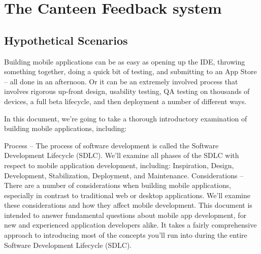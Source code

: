 
\chapter{ The Canteen Feedback system} %

\label{Chapter6} %




\section{Hypothetical Scenarios}


Building mobile applications can be as easy as opening up the IDE, throwing something together, doing a quick bit of testing, and submitting to an App Store – all done in an afternoon. Or it can be an extremely involved process that involves rigorous up-front design, usability testing, QA testing on thousands of devices, a full beta lifecycle, and then deployment a number of different ways.

In this document, we’re going to take a thorough introductory examination of building mobile applications, including:

Process – The process of software development is called the Software Development Lifecycle (SDLC). We’ll examine all phases of the SDLC with respect to mobile application development, including: Inspiration, Design, Development, Stabilization, Deployment, and Maintenance.
Considerations – There are a number of considerations when building mobile applications, especially in contrast to traditional web or desktop applications. We’ll examine these considerations and how they affect mobile development.
This document is intended to answer fundamental questions about mobile app development, for new and experienced application developers alike. It takes a fairly comprehensive approach to introducing most of the concepts you’ll run into during the entire Software Development Lifecycle (SDLC).



